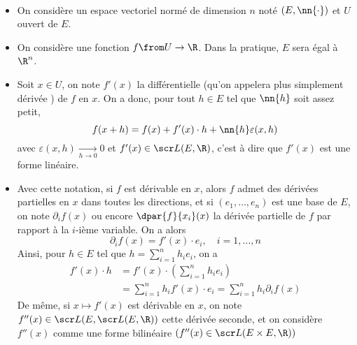 \begin{notation}\,
    \begin{itemize}
        \item On considère un espace vectoriel normé de dimension \(n\)
        noté \((E, \nn{\cdot})\) et \(U\) ouvert de \(E\).
    
        \item On considère une fonction \(f\from U\to\R\). Dans la pratique,
        \(E\) sera égal à \(\R^n\).
    
        \item Soit \(x\in U\), on note \(f'(x)\) la différentielle
        (qu'on appelera plus simplement \og{} dérivée \fg{})
        de \(f\) en \(x\). On a donc, pour tout \(h\in E\) tel que
        \(\nn{h}\) soit assez petit, 
        \begin{equation*}
            f(x+h) = f(x) + f'(x)\cdot h + \nn{h} \varepsilon(x,h)
        \end{equation*}
        avec \(\varepsilon(x,h) \underset{h\to 0}{\to} 0\)
        et \(f'(x)\in \scr L(E, \R)\), c'est à dire que \(f'(x)\) est une forme linéaire.
    
        \item Avec cette notation, si \(f\) est dérivable en \(x\),
        alors \(f\) admet des dérivées partielles en \(x\) dans toutes les
        directions, et si \((e_1,\ldots,e_n)\) est une base de \(E\),
        on note \og{}\(\partial_i f(x)\)\fg{} ou encore \og{}\(\dpar{f}{x_i}(x)\)\fg{}
        la dérivée partielle de \(f\) par rapport à la \(i\)-ième variable.
        On a alors
        \begin{equation*}
            \partial_i f(x) = f'(x)\cdot e_i,\quad i=1,\ldots,n
        \end{equation*}
        Ainsi, pour \(h\in E\) tel que \(h=\sum_{i=1}^n h_i e_i\), on a
        \begin{equation*}
            \begin{aligned}
                f'(x)\cdot h &= f'(x) \cdot \left(\sum_{i=1}^n h_i e_i\right)\\
                &= \sum_{i=1}^n h_i f'(x)\cdot e_i = \sum_{i=1}^n h_i\partial_i f(x)
            \end{aligned}
        \end{equation*}
        De même, si \(x\mapsto f'(x)\) est dérivable en \(x\), on note
        \(f''(x)\in\scr L(E, \scr L(E,\R))\) cette dérivée seconde, et on
        considère \(f''(x)\) comme une forme bilinéaire \((f''(x)\in\scr L(E\times E, \R))\)
    \end{itemize}
\end{notation}

